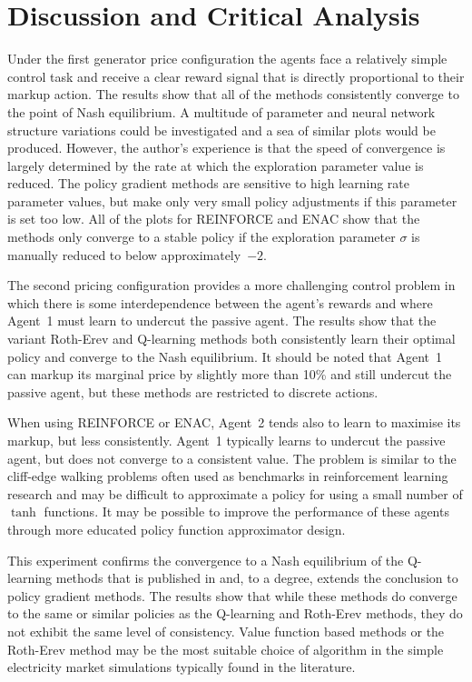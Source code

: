 \section{Discussion and Critical Analysis}
Under the first generator price configuration the agents face a
relatively simple control task and receive a clear reward signal that is
directly proportional to their markup action.  The results show that all of
the methods consistently converge to the point of Nash equilibrium.  A
multitude of parameter and neural network structure variations could be
investigated and a sea of similar plots would be produced.  However, the
author's experience is that the speed of convergence is largely determined by
the rate at which the exploration parameter value is reduced. The policy
gradient methods are sensitive to high learning rate parameter values, but
make only very small policy adjustments if this parameter is set too low. All
of the plots for REINFORCE and ENAC show that the methods only converge to a
stable policy if the exploration parameter $\sigma$ is manually reduced to
below approximately~$-2$.

The second pricing configuration provides a more challenging control problem in
which there is some interdependence between the agent's rewards and where
Agent~1 must learn to undercut the passive agent.  The results show that the
variant Roth-Erev and Q-learning methods both consistently learn their optimal
policy and converge to the Nash equilibrium.  It should be noted that Agent~1
can markup its marginal price by slightly more than 10\% and still undercut
the passive agent, but these methods are restricted to discrete actions.

When using REINFORCE or ENAC, Agent~2 tends also to learn to maximise its
markup, but less consistently.  Agent~1 typically learns to undercut the
passive agent, but does not converge to a consistent value.  The problem is
similar to the cliff-edge walking problems often used as benchmarks in
reinforcement learning research and may be difficult to approximate a policy
for using a small number of $\tanh$ functions. It may be possible to improve
the performance of these agents through more educated policy function
approximator design.

This experiment confirms the convergence to a Nash equilibrium of the
Q-learning methods that is published in  and, to a degree,
extends the conclusion to policy gradient methods.  The results show that
while these methods do converge to the same or similar policies as the
Q-learning and Roth-Erev methods, they do not exhibit the same level of
consistency.  Value function based methods or the Roth-Erev method may be the
most suitable choice of algorithm in the simple electricity market simulations
typically found in the literature.

